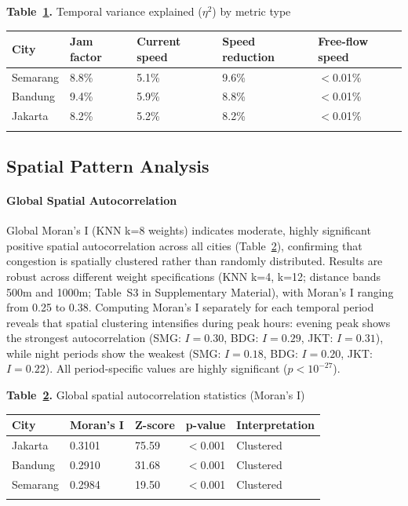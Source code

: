 \documentclass[12pt,a4paper]{article}
\begin{document}
\textbf{Table~\ref{tab:speed_validation}.} Temporal variance explained ($\eta^2$) by metric type

\begin{longtable}[]{@{}lllll@{}}
\toprule\noalign{}
City & Jam factor & Current speed & Speed reduction & Free-flow speed \\
\midrule\noalign{}
\endhead
\bottomrule\noalign{}
\endlastfoot
Semarang & 8.8\% & 5.1\% & 9.6\% & $<$0.01\% \\
Bandung & 9.4\% & 5.9\% & 8.8\% & $<$0.01\% \\
Jakarta & 8.2\% & 5.2\% & 8.2\% & $<$0.01\% \\
\label{tab:speed_validation}
\end{longtable}

\subsection{Spatial Pattern Analysis}

\paragraph{Global Spatial Autocorrelation}

Global Moran's I (KNN k=8 weights) indicates moderate, highly significant positive spatial autocorrelation across all cities (Table~\ref{tab:table_moran}), confirming that congestion is spatially clustered rather than randomly distributed. Results are robust across different weight specifications (KNN k=4, k=12; distance bands 500m and 1000m; Table~S3 in Supplementary Material), with Moran's I ranging from 0.25 to 0.38. Computing Moran's I separately for each temporal period reveals that spatial clustering intensifies during peak hours: evening peak shows the strongest autocorrelation (SMG: $I=0.30$, BDG: $I=0.29$, JKT: $I=0.31$), while night periods show the weakest (SMG: $I=0.18$, BDG: $I=0.20$, JKT: $I=0.22$). All period-specific values are highly significant ($p < 10^{-27}$).

\FloatBarrier
\textbf{Table~\ref{tab:table_moran}.} Global spatial autocorrelation statistics (Moran's I)

\begin{longtable}[]{@{}lllll@{}}
\toprule\noalign{}
City & Moran's I & Z-score & p-value & Interpretation \\
\midrule\noalign{}
\endhead
\bottomrule\noalign{}
\endlastfoot
Jakarta & 0.3101 & 75.59 & $<$0.001 & Clustered \\
Bandung & 0.2910 & 31.68 & $<$0.001 & Clustered \\
Semarang & 0.2984 & 19.50 & $<$0.001 & Clustered \\
\label{tab:table_moran}
\end{longtable}
\FloatBarrier
\end{document}
